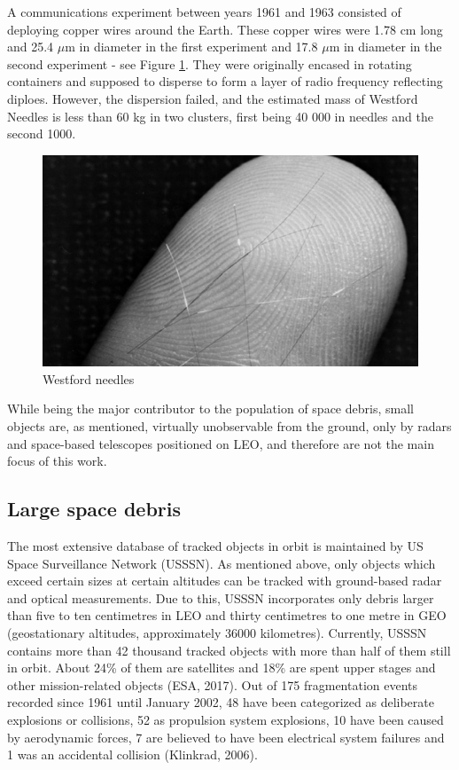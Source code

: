 	A communications experiment between years 1961 and 1963 consisted of deploying copper wires around the Earth. These copper wires were 1.78 cm long and 25.4 $\mu$m in diameter in the first experiment and 17.8 $\mu$m in diameter in the second experiment - see Figure \ref{fig:westfordneedles}. They were originally encased in rotating containers and supposed to disperse to form a layer of radio frequency reflecting diploes. However, the dispersion failed, and the estimated mass of Westford Needles is less than 60 kg in two clusters, first being 40 000 in needles and the second 1000.
	
\begin{figure}[H]
  \includegraphics[width=\linewidth]{images/westfordneedles}
  \caption{Westford needles}
  \label{fig:westfordneedles}
\end{figure}	
	
	
	While being the major contributor to the population of space debris, small objects are, as mentioned, virtually unobservable from the ground, only by radars and space-based telescopes positioned on LEO, and therefore are not the main focus of this work.

\subsection{Large space debris}\label{subsec:large_space_debris}
The most extensive database of tracked objects in orbit is maintained by US Space Surveillance Network (USSSN). As mentioned above, only objects which exceed certain sizes at certain altitudes can be tracked with ground-based radar and optical measurements. Due to this, USSSN incorporates only debris larger than five to ten centimetres in LEO and thirty centimetres to one metre in GEO (geostationary altitudes, approximately 36000 kilometres). Currently, USSSN contains more than 42 thousand tracked objects with more than half of them still in orbit. About 24\% of them are satellites and 18\% are spent upper stages and other mission-related objects (ESA, 2017). Out of 175 fragmentation events recorded since 1961 until January 2002, 48 have been categorized as deliberate explosions or collisions, 52 as propulsion system explosions, 10 have been caused by aerodynamic forces, 7 are believed to have been electrical system failures and 1 was an accidental collision (Klinkrad, 2006). 


